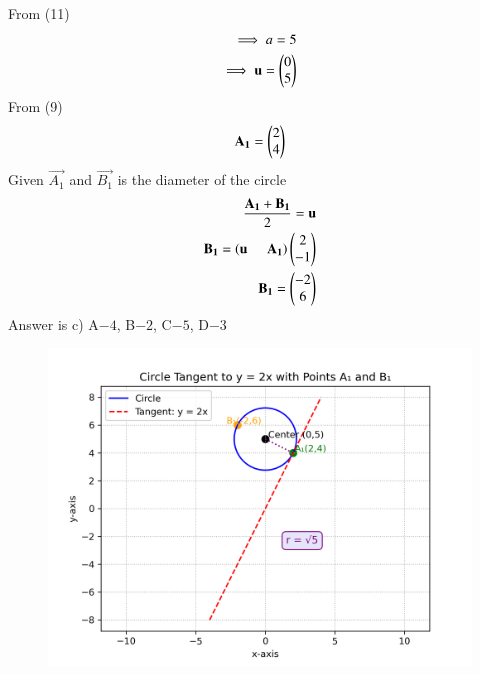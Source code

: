 \documentclass[journal]{IEEEtran}
\begin{document}
From (11)
\begin{align}
    \implies a=5\\
    \implies \mathbf{u}=\begin{pmatrix}0\\5\end{pmatrix}
\end{align}
From (9)
\begin{align}
    \mathbf{A_1}=\begin{pmatrix}2\\4\end{pmatrix}
\end{align}
Given  $\vec{A_1}$ and $\vec{B_1}$ is the diameter of the circle 
\begin{align}
    \frac{\mathbf{A_1}+\mathbf{B_1}}{2}=\mathbf{u}\\
    \mathbf{B_1}=\left(\mathbf{u} \hspace{0.5cm} \mathbf{A_1}\right)\begin{pmatrix}2\\-1\end{pmatrix}\\
    \mathbf{B_1}=\begin{pmatrix}-2\\6\end{pmatrix}
\end{align}
Answer is c) A$- 4$, B$- 2$, C$- 5$, D$- 3$
\begin{figure}[h!]
    \centering
    \includegraphics[width=0.8\columnwidth]{figs/01.png}
    \caption{}
    \label{fig:placeholder}
\end{figure}
\end{document}
